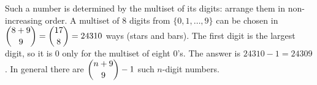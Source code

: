 Such a number is determined by the multiset of its digits: arrange them in non-increasing order. A multiset of $8$ digits from $\{0,1,\dots,9\}$ can be chosen in $\dbinom{8+9}{9}=\dbinom{17}{8}=24310$ ways (stars and bars). The first digit is the largest digit, so it is $0$ only for the multiset of eight $0$'s. The answer is $24310-1=\boxed{24309}$. In general there are $\dbinom{n+9}{9}-1$ such $n$-digit numbers.

